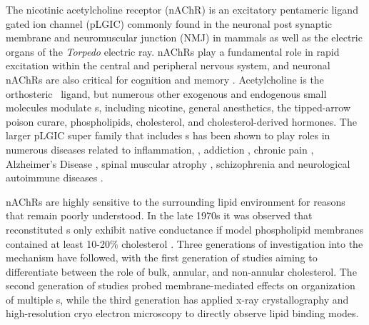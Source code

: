 The nicotinic acetylcholine receptor (nAChR) is an excitatory pentameric ligand gated ion channel (pLGIC) commonly found in the neuronal post synaptic membrane and neuromuscular junction (NMJ) in mammals 
as well as the electric organs of the \textit{Torpedo} electric ray. 
nAChRs play a fundamental role in rapid excitation within the central and peripheral nervous system, and neuronal nAChRs are also critical for cognition and memory \citep{Dani2001b, Changeux2015}. Acetylcholine is the orthosteric \nachr~ligand, but numerous other exogenous and endogenous small molecules modulate \nachr s, including nicotine, general anesthetics, the tipped-arrow poison curare,  phospholipids, cholesterol, and cholesterol-derived hormones.\citep{Klaassen2015,Taly2009}  
The larger pLGIC super family that includes \nachr s has been shown to play roles in numerous diseases related to inflammation, \citep{Patel2017,Yocum2017,Cornelison2016}, addiction \citep{Cornelison2016}, chronic pain \citep{Xiong2012}, Alzheimer's Disease \citep{Walstab2010,Picciotto_Neuroprotection_2008,MartinRuiz_4_1999}, spinal muscular atrophy \citep{Arnold_Reduced_2004}, schizophrenia \citep{Haydar2010} and neurological autoimmune diseases \citep{Lennon_Immunization_2003}.

nAChRs are highly sensitive to the surrounding lipid environment\citep{Hamouda2006a,Baenziger2017,Padilla-Morales2016,Barrantes2007} for reasons that remain poorly understood. In the late 1970s it was observed that reconstituted \nachr s only exhibit native conductance if model phospholipid membranes contained at least 10-20\% cholesterol
\citep{Dalziel1980,Criado1982,Ochoa1983}. Three generations of investigation into the mechanism have followed, with the first generation of studies\citep{Marsh1978,Dalziel1980,Marsh1981,Criado1982,Gonzalez-Ros1982,McNamee1982,Ellena1983,Ochoa1983,Zabrecky1985,Bristow1987,Leibel1987,Middlemas1987,Jones1988a,Jones1988, Fong1986,McNamee1988, Barrantes1989a,Sunshine1992,Sunshine1994,Narayanaswami1993,Addona1998,Corbin1998,Barrantes2000} aiming to differentiate between the role of bulk, annular, and non-annular cholesterol. The second generation\citep{Baenziger2015,Bruses2001,Marchand2002,Oshikawa2003,Pato2008,Zhu2006a,Baenziger2017, Barrantes2007,Barrantes2000,Barrantes2010,Bermudez2010,Perillo2016,Wenz2005,Borroni2016, Unwin2017} of studies probed membrane-mediated effects on organization of multiple \nachr s, while the third generation\citep{Basak2017,Althoff2014,Laverty2017,Zhu2018} has applied x-ray crystallography and high-resolution cryo electron microscopy to directly observe lipid binding modes. 

